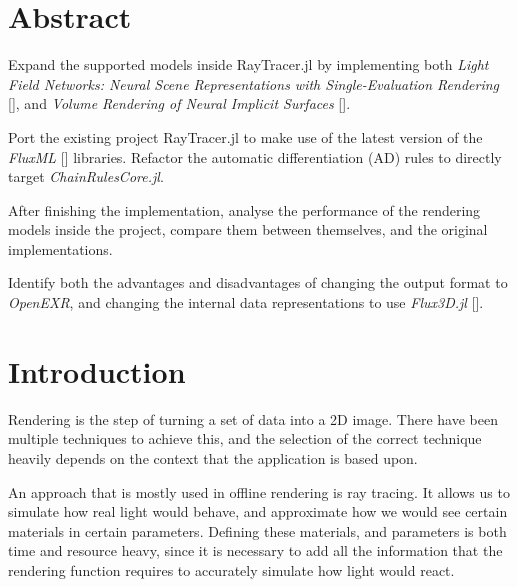 \section*{Abstract}


Expand the supported models inside RayTracer.jl by implementing both \textit{Light Field Networks: Neural Scene Representations with Single-Evaluation Rendering} [\cite{NEURIPS2021_a11ce019}], and \textit{Volume Rendering of Neural Implicit Surfaces} [\cite{NEURIPS2021_25e2a30f}].

Port the existing project RayTracer.jl to make use of the latest version of the \textit{FluxML} [\cite{Flux.jl-2018}] libraries. Refactor the automatic differentiation (AD) rules to directly target \textit{ChainRulesCore.jl}.

After finishing the implementation, analyse the performance of the rendering models inside the project, compare them between themselves, and the original implementations.

Identify both the advantages and disadvantages of changing the output format to \textit{OpenEXR}, and changing the internal data representations to use \textit{Flux3D.jl} [\cite{Suthar2020}].

\section*{Introduction}

Rendering is the step of turning a set of data into a 2D image. There have been multiple techniques to achieve this, and the selection of the correct technique heavily depends on the context that the application is based upon.

An approach that is mostly used in offline rendering
is ray tracing. It allows us to simulate how real light would behave, and approximate how we would see certain materials in certain parameters. Defining these materials, and parameters is both time and resource heavy, since it is necessary to add all the information that the rendering function requires to accurately simulate how light would react.


